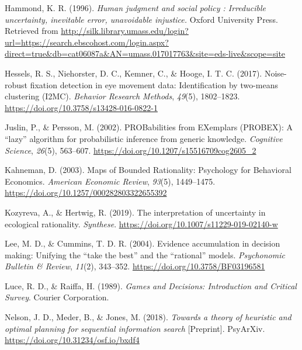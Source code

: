 \documentclass[
  english,
  man]{apa6}
\newlength{\cslhangindent}
\newenvironment{cslreferences}%
  {\setlength{\parindent}{0pt}%
  \everypar{\setlength{\hangindent}{\cslhangindent}}\ignorespaces}%
  {\par}
\begin{document}
\begin{cslreferences}
\leavevmode\hypertarget{ref-hammondHumanJudgmentSocial1996}{}%
Hammond, K. R. (1996). \emph{Human judgment and social policy : Irreducible uncertainty, inevitable error, unavoidable injustice.} Oxford University Press. Retrieved from \url{http://silk.library.umass.edu/login?url=https://search.ebscohost.com/login.aspx?direct=true\&db=cat06087a\&AN=umass.017017763\&site=eds-live\&scope=site}

\leavevmode\hypertarget{ref-hessels_noise-robust_2017}{}%
Hessels, R. S., Niehorster, D. C., Kemner, C., \& Hooge, I. T. C. (2017). Noise-robust fixation detection in eye movement data: Identification by two-means clustering (I2MC). \emph{Behavior Research Methods}, \emph{49}(5), 1802--1823. \url{https://doi.org/10.3758/s13428-016-0822-1}

\leavevmode\hypertarget{ref-juslinPROBabilitiesEXemplarsPROBEX2002}{}%
Juslin, P., \& Persson, M. (2002). PROBabilities from EXemplars (PROBEX): A ``lazy'' algorithm for probabilistic inference from generic knowledge. \emph{Cognitive Science}, \emph{26}(5), 563--607. \url{https://doi.org/10.1207/s15516709cog2605_2}

\leavevmode\hypertarget{ref-kahnemanMapsBoundedRationality2003}{}%
Kahneman, D. (2003). Maps of Bounded Rationality: Psychology for Behavioral Economics. \emph{American Economic Review}, \emph{93}(5), 1449--1475. \url{https://doi.org/10.1257/000282803322655392}

\leavevmode\hypertarget{ref-kozyrevaInterpretationUncertaintyEcological2019}{}%
Kozyreva, A., \& Hertwig, R. (2019). The interpretation of uncertainty in ecological rationality. \emph{Synthese}. \url{https://doi.org/10.1007/s11229-019-02140-w}

\leavevmode\hypertarget{ref-leeEvidenceAccumulationDecision2004}{}%
Lee, M. D., \& Cummins, T. D. R. (2004). Evidence accumulation in decision making: Unifying the ``take the best'' and the ``rational'' models. \emph{Psychonomic Bulletin \& Review}, \emph{11}(2), 343--352. \url{https://doi.org/10.3758/BF03196581}

\leavevmode\hypertarget{ref-luceGamesDecisionsIntroduction1989}{}%
Luce, R. D., \& Raiffa, H. (1989). \emph{Games and Decisions: Introduction and Critical Survey}. Courier Corporation.

\leavevmode\hypertarget{ref-nelsonTheoryHeuristicOptimal2018}{}%
Nelson, J. D., Meder, B., \& Jones, M. (2018). \emph{Towards a theory of heuristic and optimal planning for sequential information search} {[}Preprint{]}. PsyArXiv. \url{https://doi.org/10.31234/osf.io/bxdf4}


\end{cslreferences}
\end{document}
